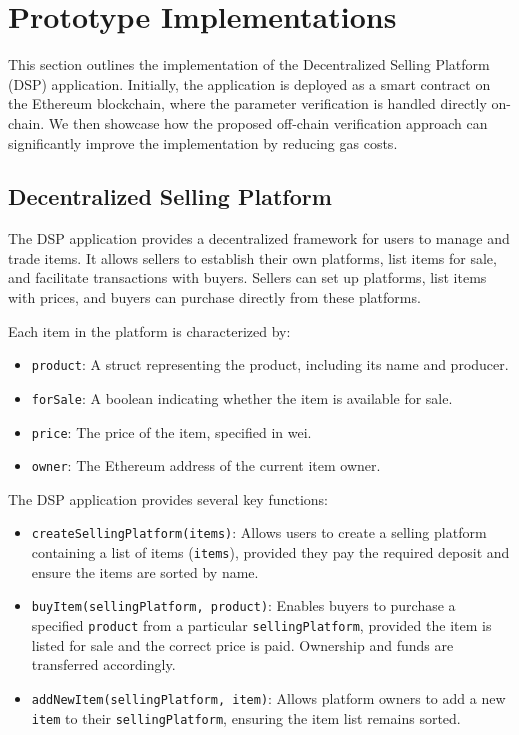 \documentclass[runningheads]{llncs}
\begin{document}
\section{Prototype Implementations}
\label{sec:prototype-implementation}

This section outlines the implementation of the Decentralized Selling Platform (DSP) application. Initially, the application is deployed as a smart contract on the Ethereum blockchain, where the parameter verification is handled directly on-chain. We then showcase how the proposed off-chain verification approach can significantly improve the implementation by reducing gas costs.

\subsection{Decentralized Selling Platform}

The DSP application provides a decentralized framework for users to manage and trade items. It allows sellers to establish their own platforms, list items for sale, and facilitate transactions with buyers. Sellers can set up platforms, list items with prices, and buyers can purchase directly from these platforms.

Each item in the platform is characterized by:

\begin{itemize}
    \item \texttt{product}: A struct representing the product, including its name and producer.
    \item \texttt{forSale}: A boolean indicating whether the item is available for sale.
    \item \texttt{price}: The price of the item, specified in wei.
    \item \texttt{owner}: The Ethereum address of the current item owner.
\end{itemize}

The DSP application provides several key functions:

\begin{itemize}
    \item \texttt{createSellingPlatform(items)}: Allows users to create a selling platform containing a list of items (\texttt{items}), provided they pay the required deposit and ensure the items are sorted by name.
    \item \texttt{buyItem(sellingPlatform, product)}: Enables buyers to purchase a specified \texttt{product} from a particular \texttt{sellingPlatform}, provided the item is listed for sale and the correct price is paid. Ownership and funds are transferred accordingly.
    \item \texttt{addNewItem(sellingPlatform, item)}: Allows platform owners to add a new \texttt{item} to their \texttt{sellingPlatform}, ensuring the item list remains sorted.
\end{itemize}
\end{document}
